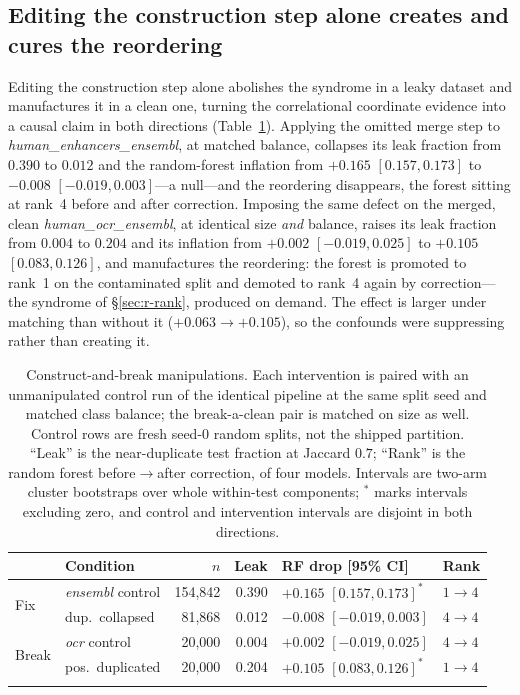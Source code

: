 \documentclass[webpdf,modern,large,namedate]{oup-authoring-template}%
\begin{document}
\subsection{Editing the construction step alone creates and cures the reordering}\label{sec:r-manip}
Editing the construction step alone abolishes the syndrome in a leaky dataset and manufactures it in a clean one, turning the correlational coordinate evidence into a causal claim in both directions (Table~\ref{tab:manip}). Applying the omitted merge step to \textit{human\_enhancers\_ensembl}, at matched balance, collapses its leak fraction from $0.390$ to $0.012$ and the random-forest inflation from $+0.165$ $[0.157,0.173]$ to $-0.008$ $[-0.019,0.003]$---a null---and the reordering disappears, the forest sitting at rank~4 before and after correction. Imposing the same defect on the merged, clean \textit{human\_ocr\_ensembl}, at identical size \emph{and} balance, raises its leak fraction from $0.004$ to $0.204$ and its inflation from $+0.002$ $[-0.019,0.025]$ to $+0.105$ $[0.083,0.126]$, and manufactures the reordering: the forest is promoted to rank~1 on the contaminated split and demoted to rank~4 again by correction---the syndrome of \S\ref{sec:r-rank}, produced on demand. The effect is larger under matching than without it ($+0.063\to+0.105$), so the confounds were suppressing rather than creating it.

\begin{table}[tbp]
\begin{center}
\caption{Construct-and-break manipulations. Each intervention is paired with an unmanipulated control run of the identical pipeline at the same split seed and matched class balance; the break-a-clean pair is matched on size as well. Control rows are fresh seed-$0$ random splits, not the shipped partition. ``Leak'' is the near-duplicate test fraction at Jaccard $0.7$; ``Rank'' is the random forest before$\to$after correction, of four models. Intervals are two-arm cluster bootstraps over whole within-test components; $^{*}$ marks intervals excluding zero, and control and intervention intervals are disjoint in both directions.\label{tab:manip}}
\footnotesize\setlength{\tabcolsep}{2.5pt}\begin{tabular}{@{}llrrll@{}}
\toprule
& Condition & $n$ & Leak & RF drop [95\% CI] & Rank\\
\midrule
\multirow{2}{*}{Fix} & \textit{ensembl} control & 154{,}842 & 0.390 & $+0.165$ $[0.157,0.173]^{*}$ & $1\!\to\!4$\\
& \quad dup.\ collapsed & 81{,}868 & 0.012 & $-0.008$ $[-0.019,0.003]$ & $4\!\to\!4$\\
\midrule
\multirow{2}{*}{Break} & \textit{ocr} control & 20{,}000 & 0.004 & $+0.002$ $[-0.019,0.025]$ & $4\!\to\!4$\\
& \quad pos.\ duplicated & 20{,}000 & 0.204 & $+0.105$ $[0.083,0.126]^{*}$ & $1\!\to\!4$\\
\botrule
\end{tabular}
\end{center}
\end{table}
\end{document}
